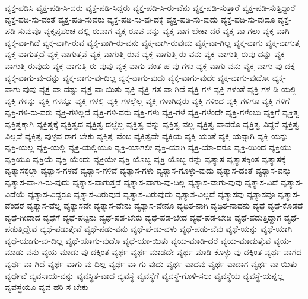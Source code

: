 {ವ್ಯಕ್ತ-ಪಡಿಸಿ
ವ್ಯಕ್ತ-ಪಡಿ-ಸಿ-ದರು
ವ್ಯಕ್ತ-ಪಡಿ-ಸಿದ್ದರು
ವ್ಯಕ್ತ-ಪಡಿ-ಸಿ-ರು-ವೆನು
ವ್ಯಕ್ತ-ಪಡಿ-ಸುತ್ತಾರೆ
ವ್ಯಕ್ತ-ಪಡಿ-ಸುತ್ತಿದ್ದಾರೆ
ವ್ಯಕ್ತ-ಪಡಿ-ಸು-ವಂತೆ
ವ್ಯಕ್ತ-ಪಡಿ-ಸುವರು
ವ್ಯಕ್ತ-ಪಡಿ-ಸು-ವು-ದಕ್ಕೆ
ವ್ಯಕ್ತ-ಪಡಿ-ಸು-ವುದು
ವ್ಯಕ್ತ-ಪಡಿ-ಸು-ವುದೂ
ವ್ಯಕ್ತ-ಪಡಿ-ಸುವುವೊ
ವ್ಯಕ್ತಪ್ರಪಂಚ-ದಲ್ಲಿ-ರುವಾಗ
ವ್ಯಕ್ತ-ರೂಪ-ವನ್ನು
ವ್ಯಕ್ತ-ವಾಗ-ಬೇಕಾ-ದರೆ
ವ್ಯಕ್ತ-ವಾ-ಗಲು
ವ್ಯಕ್ತ-ವಾಗಿ
ವ್ಯಕ್ತ-ವಾ-ಗಿದೆ
ವ್ಯಕ್ತ-ವಾಗಿ-ರುವ
ವ್ಯಕ್ತ-ವಾಗಿ-ರು-ವನು
ವ್ಯಕ್ತ-ವಾಗಿ-ರುವುದು
ವ್ಯಕ್ತ-ವಾ-ಗಿಲ್ಲ
ವ್ಯಕ್ತ-ವಾಗು
ವ್ಯಕ್ತ-ವಾಗುತ್ತ
ವ್ಯಕ್ತ-ವಾಗುತ್ತದೆ
ವ್ಯಕ್ತ-ವಾಗುತ್ತವೆ
ವ್ಯಕ್ತ-ವಾಗುತ್ತಿ-ರುವ
ವ್ಯಕ್ತ-ವಾಗುತ್ತಿ-ರು-ವನು
ವ್ಯಕ್ತ-ವಾಗುತ್ತಿ-ರುವು-ದನ್ನು
ವ್ಯಕ್ತ-ವಾಗುತ್ತಿ-ರುವುದು
ವ್ಯಕ್ತ-ವಾಗುತ್ತಿ-ರು-ವುವು
ವ್ಯಕ್ತ-ವಾಗು-ವಂತ-ಹ-ವು-ಗಳು
ವ್ಯಕ್ತ-ವಾಗು-ವನು
ವ್ಯಕ್ತ-ವಾಗು-ವು-ದಕ್ಕೆ
ವ್ಯಕ್ತ-ವಾಗು-ವು-ದನ್ನು
ವ್ಯಕ್ತ-ವಾಗು-ವು-ದಿಲ್ಲ
ವ್ಯಕ್ತ-ವಾಗು-ವುದು
ವ್ಯಕ್ತ-ವಾಗು-ವುದೇ
ವ್ಯಕ್ತ-ವಾಗು-ವುದೋ
ವ್ಯಕ್ತ-ವಾಗು-ವುವು
ವ್ಯಕ್ತ-ವಾ-ದಷ್ಟು
ವ್ಯಕ್ತ-ವಾ-ಯಿತು
ವ್ಯಕ್ತಿ
ವ್ಯಕ್ತಿ-ಗತ-ವಾ-ಗಿದೆ
ವ್ಯಕ್ತಿ-ಗಳ
ವ್ಯಕ್ತಿ-ಗಳಂತೆ
ವ್ಯಕ್ತಿ-ಗಳ-ಡಿ-ಯಲ್ಲಿ
ವ್ಯಕ್ತಿ-ಗಳನ್ನು
ವ್ಯಕ್ತಿ-ಗಳನ್ನೂ
ವ್ಯಕ್ತಿ-ಗಳಲ್ಲಿ
ವ್ಯಕ್ತಿ-ಗಳಲ್ಲೆಲ್ಲ
ವ್ಯಕ್ತಿ-ಗಳಾಗಿದ್ದರು
ವ್ಯಕ್ತಿ-ಗಳಿಂದ
ವ್ಯಕ್ತಿ-ಗಳಿಗೂ
ವ್ಯಕ್ತಿ-ಗಳಿಗೆ
ವ್ಯಕ್ತಿ-ಗಳಿ-ರು-ವರು
ವ್ಯಕ್ತಿ-ಗಳಿಲ್ಲದೆ
ವ್ಯಕ್ತಿ-ಗಳಿ-ವರು
ವ್ಯಕ್ತಿ-ಗಳು
ವ್ಯಕ್ತಿ-ಗಳೆ
ವ್ಯಕ್ತಿ-ಗಳೆಂದೇ
ವ್ಯಕ್ತಿ-ಗಳೆಂಬು
ವ್ಯಕ್ತಿಗೆ
ವ್ಯಕ್ತಿತ್ವ
ವ್ಯಕ್ತಿತ್ವಕ್ಕಾಗಿ
ವ್ಯಕ್ತಿತ್ವಕ್ಕೆ
ವ್ಯಕ್ತಿತ್ವದ
ವ್ಯಕ್ತಿತ್ವ-ದಲ್ಲೆಲ್ಲ
ವ್ಯಕ್ತಿತ್ವ-ವನ್ನು
ವ್ಯಕ್ತಿತ್ವ-ವಲ್ಲ
ವ್ಯಕ್ತಿತ್ವ-ವಾದರೊ
ವ್ಯಕ್ತಿತ್ವ-ವಿದ್ದರೆ
ವ್ಯಕ್ತಿತ್ವ-ವಿಲ್ಲವೆ
ವ್ಯಕ್ತಿತ್ವ-ವುಳ್ಳವ-ರಾಗ-ಬೇಕು
ವ್ಯಕ್ತಿತ್ವ-ವೆಂಬ
ವ್ಯಕ್ತಿತ್ವವೇ
ವ್ಯಕ್ತಿಯ
ವ್ಯಕ್ತಿ-ಯಂತೆ
ವ್ಯಕ್ತಿ-ಯನ್ನಾಗಿ
ವ್ಯಕ್ತಿ-ಯನ್ನು
ವ್ಯಕ್ತಿ-ಯಲ್ಲ
ವ್ಯಕ್ತಿ-ಯಲ್ಲಿ
ವ್ಯಕ್ತಿ-ಯಲ್ಲಿಯೂ
ವ್ಯಕ್ತಿ-ಯಾಗಲೀ
ವ್ಯಕ್ತಿ-ಯಾಗಿ
ವ್ಯಕ್ತಿ-ಯಾ-ದರೂ
ವ್ಯಕ್ತಿ-ಯಿಂದ
ವ್ಯಕ್ತಿಯು
ವ್ಯಕ್ತಿಯೂ
ವ್ಯಕ್ತಿಯೆ
ವ್ಯಕ್ತಿ-ಯೆಂದು
ವ್ಯಕ್ತಿಯೇ
ವ್ಯಕ್ತಿ-ಯೊಬ್ಬ
ವ್ಯಕ್ತಿ-ಯೊಬ್ಬ-ರನ್ನು
ವ್ಯತ್ಯಾಸ
ವ್ಯತ್ಯಾಸಕ್ಕಿಂತ
ವ್ಯತ್ಯಾಸಕ್ಕೆ
ವ್ಯತ್ಯಾಸಕ್ಕೆಲ್ಲಾ
ವ್ಯತ್ಯಾಸ-ಗಳವೆ
ವ್ಯತ್ಯಾಸ-ಗಳಿವೆ
ವ್ಯತ್ಯಾಸ-ಗಳು
ವ್ಯತ್ಯಾಸ-ಗೊಳ್ಳು-ವುದು
ವ್ಯತ್ಯಾಸ-ದಂತೆ
ವ್ಯತ್ಯಾಸ-ವನ್ನು
ವ್ಯತ್ಯಾಸ-ವಾ-ಗಿ-ರು-ವುದು
ವ್ಯತ್ಯಾಸ-ವಾಗುತ್ತದೆ
ವ್ಯತ್ಯಾಸ-ವಾಗು-ವು-ದಿಲ್ಲ
ವ್ಯತ್ಯಾಸ-ವಾಗು-ವುವು
ವ್ಯತ್ಯಾಸ-ವಿದೆ
ವ್ಯತ್ಯಾಸ-ವಿದೆಯೆ
ವ್ಯತ್ಯಾಸ-ವಿದ್ದರೂ
ವ್ಯತ್ಯಾಸ-ವಿರುವುದ
ವ್ಯತ್ಯಾಸ-ವಿರುವುದು
ವ್ಯತ್ಯಾಸ-ವಿಲ್ಲದೆ
ವ್ಯತ್ಯಾಸವು
ವ್ಯತ್ಯಾಸವೂ
ವ್ಯತ್ಯಾಸ-ವೆಂದರೆ
ವ್ಯತ್ಯಾಸ-ವೆಲ್ಲ
ವ್ಯತ್ಯಾಸವೇ
ವ್ಯತ್ಯಾಸ-ವೇನು
ವ್ಯತ್ಯಾಸ-ವೇನೂ
ವ್ಯಥಿತ-ನಾಗಿ
ವ್ಯಥಿತ-ನಾದನು
ವ್ಯಥೆ
ವ್ಯಥೆ-ಕೊಡದೆ
ವ್ಯಥೆ-ಗೀಡಾದ
ವ್ಯಥೆಗೆ
ವ್ಯಥೆ-ಪಟ್ಟನು
ವ್ಯಥೆ-ಪಡ-ಬೇಕು
ವ್ಯಥೆ-ಪಡ-ಬೇಡ
ವ್ಯಥೆ-ಪಡ-ಬೇಡಿ
ವ್ಯಥೆ-ಪಡುತ್ತಿದ್ದಾಗ
ವ್ಯಥೆ-ಪಡುತ್ತಿದ್ದೇವೆ
ವ್ಯಥೆ-ಪಡುತ್ತೇವೆ
ವ್ಯಥೆ-ಪಡು-ವನು
ವ್ಯಥೆ-ಪ-ಡು-ವಳು
ವ್ಯಥೆ-ಪಡು-ವೆವು
ವ್ಯಥೆ-ಯನ್ನು
ವ್ಯಥೆ-ಯಾಗಿ
ವ್ಯಥೆ-ಯಾಗು-ವು-ದಿಲ್ಲ
ವ್ಯಥೆ-ಯಾಗು-ವುದೊ
ವ್ಯಥೆ-ಯಾ-ಯಿತು
ವ್ಯಯ-ಮಾಡಿ-ದರೆ
ವ್ಯಯ-ಮಾಡುತ್ತೇವೆ
ವ್ಯಯ-ಮಾಡು-ವನು
ವ್ಯಯ-ಮಾಡು-ವು-ದಕ್ಕಿಂತ
ವ್ಯರ್ಥ
ವ್ಯರ್ಥ-ಮಾಡದೇ
ವ್ಯರ್ಥ-ಮಾಡಿ-ಕೊಳ್ಳು-ವು-ದಕ್ಕಿಂತ
ವ್ಯರ್ಥ-ವಾಗದ
ವ್ಯರ್ಥ-ವಾ-ಗಿದೆ
ವ್ಯರ್ಥ-ವಾಗು-ವು-ದಿಲ್ಲ
ವ್ಯರ್ಥ-ವಾ-ಗು-ವುದು
ವ್ಯರ್ಥ-ವಾದವು
ವ್ಯರ್ಥ-ವಾದಾಗ
ವ್ಯರ್ಥ-ವಾ-ಯಿತು
ವ್ಯರ್ಥವೆ
ವ್ಯವಸಾಯ-ವನ್ನು
ವ್ಯವಸ್ಥಿತ-ವಾದ
ವ್ಯವಸ್ಥೆ
ವ್ಯವಸ್ಥೆಗೆ
ವ್ಯವಸ್ಥೆ-ಗೊಳಿ-ಸಲು
ವ್ಯವಸ್ಥೆಯ
ವ್ಯವಸ್ಥೆ-ಯನ್ನಲ್ಲ
ವ್ಯವಸ್ಥೆಯೂ
ವ್ಯವ-ಹರಿ-ಸ-ಬೇಕು
}
